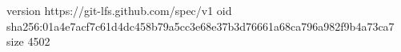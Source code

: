version https://git-lfs.github.com/spec/v1
oid sha256:01a4e7acf7c61d4dc458b79a5cc3e68e37b3d76661a68ca796a982f9b4a73ca7
size 4502
